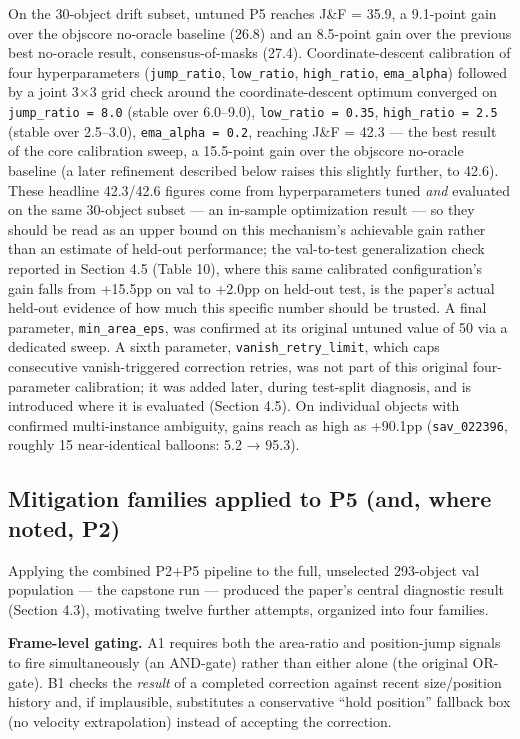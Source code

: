 \documentclass[11pt]{article}
\begin{document}
On the 30-object drift subset, untuned P5 reaches J\&F = 35.9, a 9.1-point gain over the objscore no-oracle baseline (26.8) and an 8.5-point gain over the previous best no-oracle result, consensus-of-masks (27.4). Coordinate-descent calibration of four hyperparameters (\texttt{jump\_ratio}, \texttt{low\_ratio}, \texttt{high\_ratio}, \texttt{ema\_alpha}) followed by a joint 3×3 grid check around the coordinate-descent optimum converged on \texttt{jump\_ratio = 8.0} (stable over 6.0–9.0), \texttt{low\_ratio = 0.35}, \texttt{high\_ratio = 2.5} (stable over 2.5–3.0), \texttt{ema\_alpha = 0.2}, reaching J\&F = 42.3 — the best result of the core calibration sweep, a 15.5-point gain over the objscore no-oracle baseline (a later refinement described below raises this slightly further, to 42.6). These headline 42.3/42.6 figures come from hyperparameters tuned \emph{and} evaluated on the same 30-object subset — an in-sample optimization result — so they should be read as an upper bound on this mechanism's achievable gain rather than an estimate of held-out performance; the val-to-test generalization check reported in Section 4.5 (Table 10), where this same calibrated configuration's gain falls from +15.5pp on val to +2.0pp on held-out test, is the paper's actual held-out evidence of how much this specific number should be trusted. A final parameter, \texttt{min\_area\_eps}, was confirmed at its original untuned value of 50 via a dedicated sweep. A sixth parameter, \texttt{vanish\_retry\_limit}, which caps consecutive vanish-triggered correction retries, was not part of this original four-parameter calibration; it was added later, during test-split diagnosis, and is introduced where it is evaluated (Section 4.5). On individual objects with confirmed multi-instance ambiguity, gains reach as high as +90.1pp (\texttt{sav\_022396}, roughly 15 near-identical balloons: 5.2 → 95.3).

\subsection{Mitigation families applied to P5 (and, where noted, P2)}

Applying the combined P2+P5 pipeline to the full, unselected 293-object val population — the capstone run — produced the paper's central diagnostic result (Section 4.3), motivating twelve further attempts, organized into four families.

\textbf{Frame-level gating.} A1 requires both the area-ratio and position-jump signals to fire simultaneously (an AND-gate) rather than either alone (the original OR-gate). B1 checks the \emph{result} of a completed correction against recent size/position history and, if implausible, substitutes a conservative ``hold position'' fallback box (no velocity extrapolation) instead of accepting the correction.
\end{document}

